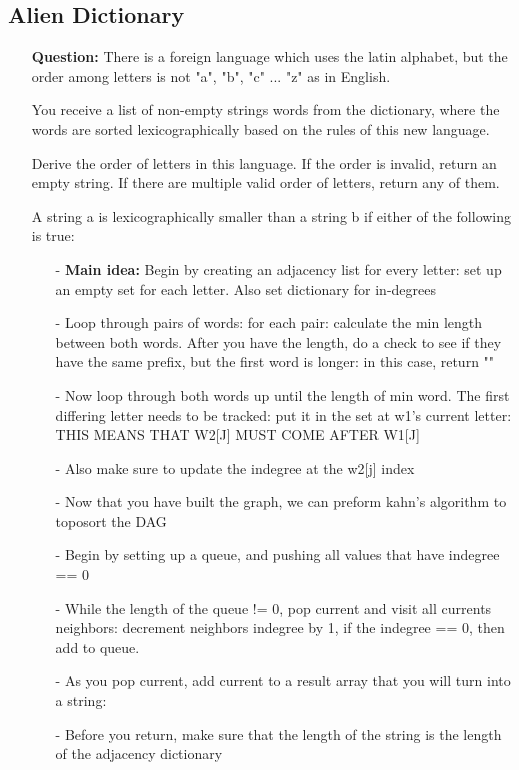 \documentclass[12pt]{article}
\begin{document}
\subsection{Alien Dictionary}
\begin{enumerate}
  \item[] \textbf{Question:} There is a foreign language which uses the latin alphabet, but the order among letters is not "a", "b", "c" ... "z" as in English.

You receive a list of non-empty strings words from the dictionary, where the words are sorted lexicographically based on the rules of this new language.

Derive the order of letters in this language. If the order is invalid, return an empty string. If there are multiple valid order of letters, return any of them.

A string a is lexicographically smaller than a string b if either of the following is true: 


    \begin{enumerate}
      \item[-] \textbf{Main idea:} Begin by creating an adjacency list for every letter: set up an empty set for each letter. Also set dictionary for in-degrees
      \item[-] Loop through pairs of words: for each pair: calculate the min length between both words. After you have the length, do a check to see if they have the same prefix, but the first word is longer: in this case, return ""
      \item[-] Now loop through both words up until the length of min word. The first differing letter needs to be tracked: put it in the set at w1's current letter: THIS MEANS THAT W2[J] MUST COME AFTER W1[J]
      \item[-] Also make sure to update the indegree at the w2[j] index
      \item[-] Now that you have built the graph, we can preform kahn's algorithm to toposort the DAG
      \item[-] Begin by setting up a queue, and pushing all values that have indegree == 0
      \item[-] While the length of the queue != 0, pop current and visit all currents neighbors: decrement neighbors indegree by 1, if the indegree == 0, then add to queue.
      \item[-] As you pop current, add current to a result array that you will turn into a string: 
      \item[-] Before you return, make sure that the length of the string is the length of the adjacency dictionary
    \end{enumerate}
\end{enumerate}
\end{document}
